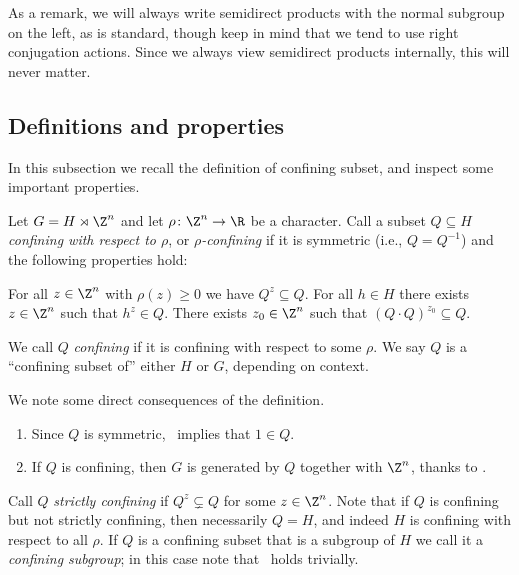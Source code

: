 As a remark, we will always write semidirect products with the normal subgroup on the left, as is standard, though keep in mind that we tend to use right conjugation actions. Since we always view semidirect products internally, this will never matter.


\subsection{Definitions and properties}\label{ssec:confining_defs}

In this subsection we recall the definition of confining subset, and inspect some important properties.

\begin{defi}\label{def:confining}
Let $G=H\rtimes \Z^n$ and let $\rho\colon \Z^n \to\R$ be a character. Call a subset $Q\subseteq H$ \emph{confining with respect to $\rho$}, or \emph{$\rho$-confining} if it is symmetric (i.e., $Q = Q^{-1}$) and the following properties hold:
\begin{description}
     For all $z\in\Z^n$ with $\rho(z)\ge 0$ we have $Q^z\subseteq Q$.
     For all $h\in H$ there exists $z\in \Z^n$ such that $h^z\in Q$.
     There exists $z_0\in \Z^n$ such that $(Q\cdot Q)^{z_0}\subseteq Q$.
\end{description}
We call $Q$ \emph{confining} if it is confining with respect to some $\rho$. We say $Q$ is a ``confining subset of'' either $H$ or $G$, depending on context.
\end{defi}

\begin{rema}
\label{rem:conf:consequences}
We note some direct consequences of the definition.
\begin{enumerate}
\item Since $Q$ is symmetric, \ProdConf\ implies that $1\in Q$.
\item If $Q$ is confining, then $G$ is generated by $Q$ together with $\Z^n$, thanks to \GetInConf.
\end{enumerate}
\end{rema}

Call $Q$ \emph{strictly confining} if $Q^z\subsetneq Q$ for some $z\in\Z^n$. Note that if $Q$ is confining but not strictly confining, then necessarily $Q=H$, and indeed $H$ is confining with respect to all $\rho$. If $Q$ is a confining subset that is a subgroup of $H$ we call it a \emph{confining subgroup}; in this case note that \ProdConf\ holds trivially.

